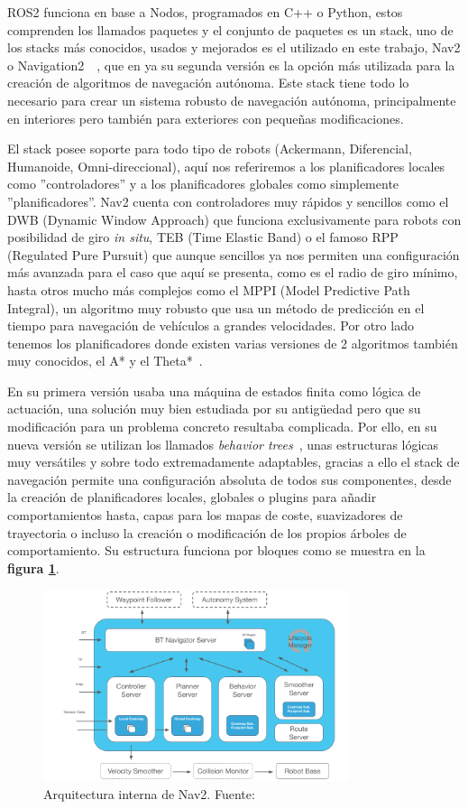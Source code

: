 ROS2 funciona en base a Nodos, programados en C++ o Python, estos comprenden los llamados paquetes y el conjunto de paquetes es un stack, 
uno de los stacks más conocidos, usados y mejorados es el utilizado en este trabajo, Nav2 o Navigation2~\cite{nav2}~, que en ya su segunda 
versión es la opción más utilizada para la creación de algoritmos de navegación autónoma.
Este stack tiene todo lo necesario para crear un sistema robusto de navegación autónoma, principalmente en interiores pero también para exteriores con pequeñas modificaciones.

El stack posee soporte para todo tipo de robots (Ackermann, Diferencial, Humanoide, Omni-direccional), aquí nos referiremos a los planificadores locales
como ''controladores'' y a los planificadores globales como simplemente ''planificadores''. Nav2 cuenta con controladores muy rápidos y 
sencillos como el DWB (Dynamic Window Approach) que funciona exclusivamente para robots con posibilidad de giro \textit{in situ}, TEB 
(Time Elastic Band) o el famoso RPP (Regulated Pure Pursuit) que aunque sencillos ya nos permiten una configuración más avanzada
para el caso que aquí se presenta, como es el radio de giro mínimo, hasta otros mucho más complejos como el MPPI (Model Predictive Path Integral), un algoritmo 
muy robusto que usa un método de predicción en el tiempo para navegación de vehículos a grandes velocidades. Por otro lado tenemos los 
planificadores donde existen varias versiones de 2 algoritmos también muy conocidos, el A* y el Theta*~\cite{sun2023path}.

En su primera versión usaba una máquina de estados finita como lógica de actuación, una solución muy bien estudiada por su antigüedad
pero que su modificación para un problema concreto resultaba complicada. Por ello, en su nueva versión se utilizan los llamados 
\textit{behavior trees}~\cite{colledanchise2018behavior}, unas estructuras lógicas muy versátiles y sobre todo extremadamente adaptables, 
gracias a ello el stack de navegación permite una configuración absoluta de todos sus componentes, desde la creación de planificadores locales, globales o
plugins para añadir comportamientos hasta, capas para los mapas de coste, suavizadores de trayectoria o incluso la creación o modificación de los 
propios árboles de comportamiento. Su estructura funciona por bloques como se muestra en la  \textbf{figura \ref{fig:nav2_arch}}.
\begin{figure}[h]
    \centering
    \includegraphics[width=0.8\textwidth]{images/nav2_architecture.png}
    \caption{Arquitectura interna de Nav2. Fuente:~\cite{nav2}}
    \label{fig:nav2_arch}
\end{figure}
\newpage
